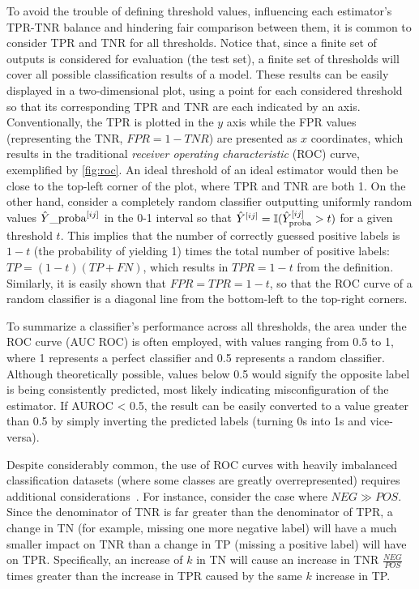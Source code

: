 To avoid the trouble of defining threshold values, influencing each estimator's TPR-TNR balance and hindering fair comparison between them, it is common to consider TPR and TNR for all thresholds.
Notice that, since a finite set of outputs is considered for evaluation (the test set), a finite set of thresholds will cover all possible classification results of a model. These results can be easily displayed in a two-dimensional plot, using a point for each considered threshold so that its corresponding TPR and TNR are each indicated by an axis. Conventionally, the TPR is plotted in the $y$ axis while the FPR values (representing the TNR, $FPR=1-TNR$) are presented as $x$ coordinates, which results in the traditional \emph{receiver operating characteristic} (ROC) curve, exemplified by \autoref{fig:roc}.
An ideal threshold of an ideal estimator would then be close to the top-left corner of the plot, where TPR and TNR are both 1.
On the other hand, consider a completely random classifier outputting uniformly random values $\hat Y\_\text{proba}^{[ij]}$ in the 0-1 interval so that $\hat Y^{[ij]} = \mathbb{I}(\hat Y_\text{proba}^{[ij]} > t)$ for a given threshold $t$. This implies that the number of correctly guessed positive labels is $1-t$ (the probability of yielding 1) times the total number of positive labels: $TP = (1-t) (TP+FN)$, which results in $TPR = 1-t$ from the definition. Similarly, it is easily shown that $FPR = TPR = 1-t$, so that the ROC curve of a random classifier is a diagonal line from the bottom-left to the top-right corners.



To summarize a classifier's performance across all thresholds, the area under the ROC curve (AUC ROC) is often employed, with values ranging from 0.5 to 1, where 1 represents a perfect classifier and 0.5 represents a random classifier. Although theoretically possible, values below 0.5 would signify the opposite label is being consistently predicted, most likely indicating misconfiguration of the estimator. If AUROC < 0.5, the result can be easily converted to a value greater than 0.5 by simply inverting the predicted labels (turning 0s into 1s and vice-versa).

Despite considerably common, the use of ROC curves with heavily imbalanced classification datasets (where some classes are greatly overrepresented) requires additional considerations~\cite{he2009learning,saito2015precision,fernandez2018learning}.
For instance,%
consider the case where $NEG \gg POS$. Since the denominator of TNR is far greater than the denominator of TPR, a change in TN (for example, missing one more negative label) will have a much smaller impact on TNR than a change in TP (missing a positive label) will have on TPR.
Specifically, an increase of $k$ in TN will cause an increase in TNR $\frac{NEG}{POS}$ times greater than the increase in TPR caused by the same $k$ increase in TP.

